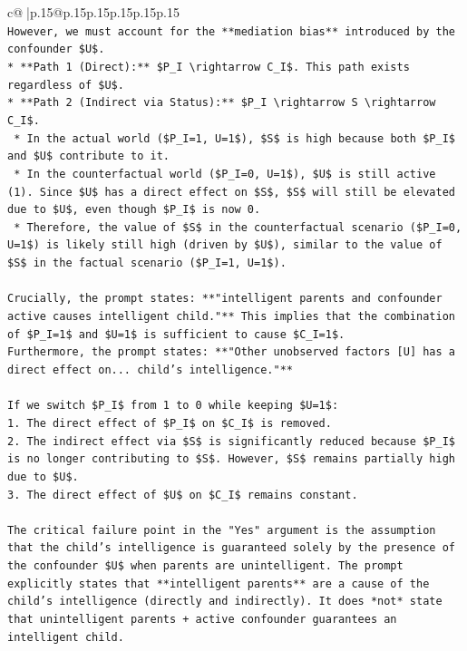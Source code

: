 \documentclass{article}
\begin{document}
{\begin{supertabular}{c@{$\;$}|p{.15\linewidth}@{}p{.15\linewidth}p{.15\linewidth}p{.15\linewidth}p{.15\linewidth}p{.15\linewidth}}
{{{\\ 
\texttt{However, we must account for the **mediation bias** introduced by the confounder \$U\$.} \\
\texttt{*   **Path 1 (Direct):** \$P\_I \textbackslash{}rightarrow C\_I\$. This path exists regardless of \$U\$.} \\
\texttt{*   **Path 2 (Indirect via Status):** \$P\_I \textbackslash{}rightarrow S \textbackslash{}rightarrow C\_I\$.} \\
\texttt{    *   In the actual world (\$P\_I=1, U=1\$), \$S\$ is high because both \$P\_I\$ and \$U\$ contribute to it.} \\
\texttt{    *   In the counterfactual world (\$P\_I=0, U=1\$), \$U\$ is still active (1). Since \$U\$ has a direct effect on \$S\$, \$S\$ will still be elevated due to \$U\$, even though \$P\_I\$ is now 0.} \\
\texttt{    *   Therefore, the value of \$S\$ in the counterfactual scenario (\$P\_I=0, U=1\$) is likely still high (driven by \$U\$), similar to the value of \$S\$ in the factual scenario (\$P\_I=1, U=1\$).} \\
\\ 
\texttt{Crucially, the prompt states: **"intelligent parents and confounder active causes intelligent child."** This implies that the combination of \$P\_I=1\$ and \$U=1\$ is sufficient to cause \$C\_I=1\$.} \\
\texttt{Furthermore, the prompt states: **"Other unobserved factors {[}U{]} has a direct effect on... child's intelligence."**} \\
\\ 
\texttt{If we switch \$P\_I\$ from 1 to 0 while keeping \$U=1\$:} \\
\texttt{1.  The direct effect of \$P\_I\$ on \$C\_I\$ is removed.} \\
\texttt{2.  The indirect effect via \$S\$ is significantly reduced because \$P\_I\$ is no longer contributing to \$S\$. However, \$S\$ remains partially high due to \$U\$.} \\
\texttt{3.  The direct effect of \$U\$ on \$C\_I\$ remains constant.} \\
\\ 
\texttt{The critical failure point in the "Yes" argument is the assumption that the child's intelligence is guaranteed solely by the presence of the confounder \$U\$ when parents are unintelligent. The prompt explicitly states that **intelligent parents** are a cause of the child's intelligence (directly and indirectly). It does *not* state that unintelligent parents + active confounder guarantees an intelligent child.} \\
}}}
\end{supertabular}}
\end{document}
